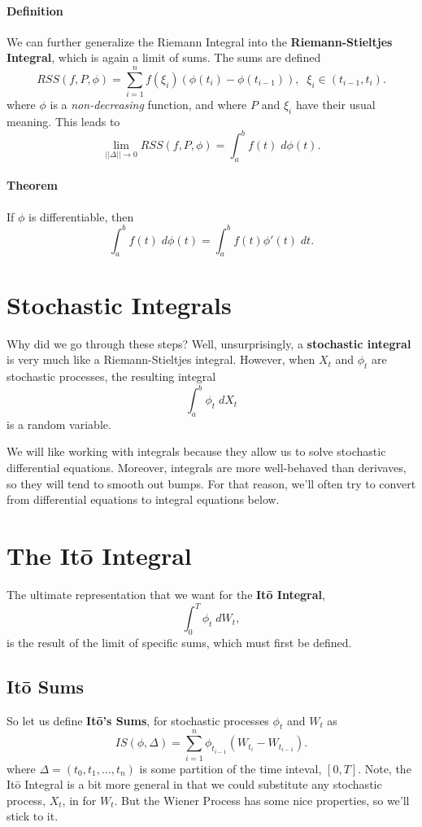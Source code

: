 \documentclass[a4paper,12pt]{scrartcl}
\begin{document}
\paragraph{Definition} We can further generalize the Riemann Integral
into the \textbf{Riemann-Stieltjes Integral}, which is again a limit
of sums.  The sums are defined
   \[ RSS(f,P,\phi) = \sum^n_{i=1} f(\xi_i) (\phi(t_i) - \phi(t_{i-1}))
      , \;\; \xi_i \in (t_{i-1}, t_i).\]
where $\phi$ is a \emph{non-decreasing} function, and where $P$ and 
$\xi_i$ have their usual meaning. This leads to
   \[ \lim_{||\Delta||\rightarrow 0} RSS(f,P,\phi) = 
      \int^b_a f(t)\; d\phi(t).\]

\paragraph{Theorem} If $\phi$ is differentiable, then
   \[ \int_a^b f(t)\; d\phi(t) = \int^b_a f(t) \phi'(t) \;dt.\]

\section{Stochastic Integrals}

Why did we go through these steps? Well, unsurprisingly, a 
\textbf{stochastic integral} is very much like a Riemann-Stieltjes
integral.  However, when $X_t$ and $\phi_t$ are stochastic processes,
the resulting integral
   \[ \int^b_a \phi_t\; dX_t \]
is a random variable.

We will like working with integrals because they allow us to solve
stochastic differential equations. Moreover, integrals are more
well-behaved than derivaves, so they will tend to smooth out bumps. For
that reason, we'll often try to convert from differential equations
to integral equations below.

\section{The It\={o} Integral}

The ultimate representation that we want for the \textbf{It\={o}
Integral}, 
   \[ \int_0^T \phi_t \;dW_t, \]
is the result of the limit of specific sums, which must first be defined.

\subsection{It\={o} Sums}

So let us define \textbf{It\={o}'s Sums}, for stochastic processes
$\phi_t$ and $W_t$ as
   \[ IS(\phi,\Delta)=\sum^n_{i=1} \phi_{t_{i-1}}(W_{t_i}-W_{t_{i-1}}).\]
where $\Delta = (t_0, t_1,\ldots,t_n)$ is some partition of the time 
inteval, $[0,T]$. Note, the It\={o} Integral 
is a bit more general in that we
could substitute any stochastic process, $X_t$, in for $W_t$.  But 
the Wiener Process has some nice properties, so we'll stick to it.
\end{document}
